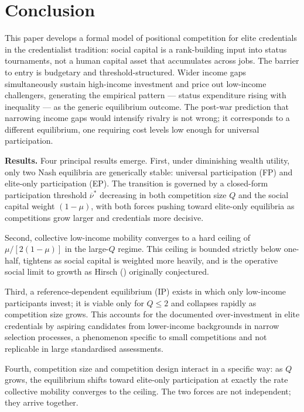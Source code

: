 \documentclass[
    oneside,
    fontsize=10pt,leqno]{article}
\begin{document}
\section{\label{sec:Conclusion}Conclusion}

\noindent

This paper develops a formal model of positional competition for
elite credentials in the credentialist tradition: social
capital is a rank-building input into status tournaments, not a
human capital asset that accumulates across jobs. The barrier to
entry is budgetary and threshold-structured. Wider income gaps
simultaneously sustain high-income investment and price out
low-income challengers, generating the empirical pattern --- status
expenditure rising with inequality --- as the generic equilibrium
outcome. The post-war prediction that narrowing income gaps would
intensify rivalry is not wrong; it corresponds to a different
equilibrium, one requiring cost levels low enough for universal
participation.

\medskip
\noindent\textbf{Results.} Four principal results emerge. First,
under diminishing wealth utility, only two Nash equilibria are
generically stable: universal participation (FP) and
elite-only participation (EP). The transition is governed by
a closed-form participation threshold $\overline{\nu}^*$ decreasing
in both competition size $Q$ and the social capital weight
$(1-\mu)$, with both forces pushing toward elite-only equilibria
as competitions grow larger and credentials more decisive.

Second, collective low-income mobility converges to a hard ceiling
of $\mu/[2(1-\mu)]$ in the large-$Q$ regime. This ceiling is
bounded strictly below one-half, tightens as social capital is
weighted more heavily, and is the operative social limit to growth
as Hirsch (\citeyear{HirschSocialLimits}) originally conjectured.

Third, a reference-dependent equilibrium (IP) exists in which
only low-income participants invest; it is viable only for $Q \leq 2$
and collapses rapidly as competition size grows. This accounts for
the documented over-investment in elite credentials by aspiring
candidates from lower-income backgrounds in narrow selection
processes, a phenomenon specific to small competitions and not
replicable in large standardised assessments.

Fourth, competition size and competition design interact in a
specific way: as $Q$ grows, the equilibrium shifts toward
elite-only participation at exactly the rate collective mobility
converges to the ceiling. The two forces are not independent;
they arrive together.
\end{document}
